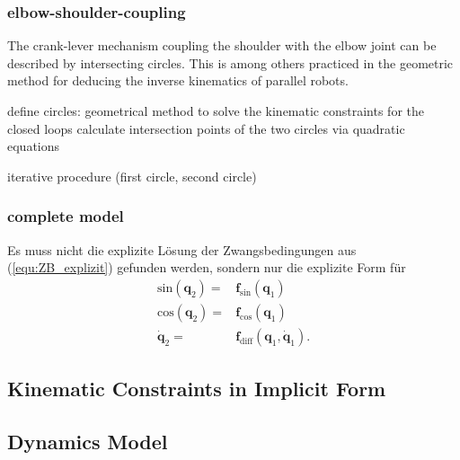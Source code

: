 \documentclass[letterpaper, 10 pt, conference]{ieeeconf}  %
\begin{document}
\subsubsection{elbow-shoulder-coupling}

The crank-lever mechanism coupling the shoulder with the elbow joint can be described by intersecting circles. This is among others practiced in the geometric method for deducing the inverse kinematics of parallel robots.


define circles: geometrical method to solve the kinematic constraints for the closed loops
calculate intersection points of the two circles via quadratic equations 

iterative procedure (first circle, second circle)

\subsubsection{complete model}



Es muss nicht die explizite Lösung der Zwangsbedingungen aus (\ref{equ:ZB_explizit}) gefunden werden, sondern nur die explizite Form für 
%
\begin{align}
\mathrm{sin}(\bm{q}_2) =& \bm{f}_\mathrm{sin}(\bm{q}_1) \\
\mathrm{cos}(\bm{q}_2) =& \bm{f}_\mathrm{cos}(\bm{q}_1) \\
\dot{\bm{q}}_2 =& \bm{f}_\mathrm{diff}(\bm{q}_1,\dot{\bm{q}}_1).
\end{align}


\subsection{Kinematic Constraints in Implicit Form}



\subsection{Dynamics Model}
\end{document}
